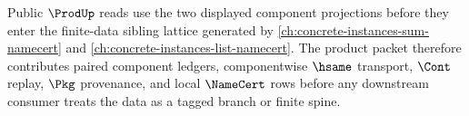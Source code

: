 Public $\ProdUp$ reads use the two displayed component projections before they enter the finite-data sibling lattice generated by \autoref{ch:concrete-instances-sum-namecert} and \autoref{ch:concrete-instances-list-namecert}. The product packet therefore contributes paired component ledgers, componentwise $\hsame$ transport, $\Cont$ replay, $\Pkg$ provenance, and local $\NameCert$ rows before any downstream consumer treats the data as a tagged branch or finite spine.
